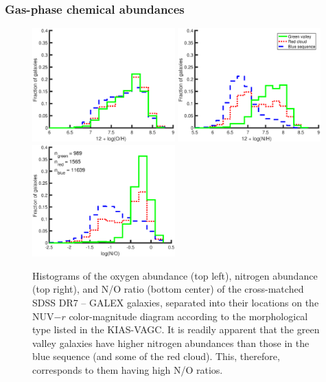 \subsubsection{Gas-phase chemical abundances}

\begin{figure}
    \includegraphics[width=0.49\textwidth]{Images/GV/Z12logOH_I06relations_t3}
    \includegraphics[width=0.49\textwidth]{Images/GV/N12logNH_I06relations_t3}
    \includegraphics[width=0.49\textwidth]{Images/GV/logNO_I06relations_t3}
    \caption[Distribution of gas-phase chemical abundances in cross-matched SDSS 
    DR7 -- GALEX galaxies]{Histograms of the oxygen abundance (top left), 
    nitrogen abundance (top right), and N/O ratio (bottom center) of the 
    cross-matched SDSS DR7 -- GALEX galaxies, separated into their locations on 
    the NUV$-r$ color-magnitude diagram according to the morphological type 
    listed in the KIAS-VAGC.  It is readily apparent that the green valley 
    galaxies have higher nitrogen abundances than those in the blue sequence 
    (and some of the red cloud).  This, therefore, corresponds to them having 
    high N/O ratios.}
    \label{fig:Z_hist}
\end{figure}

